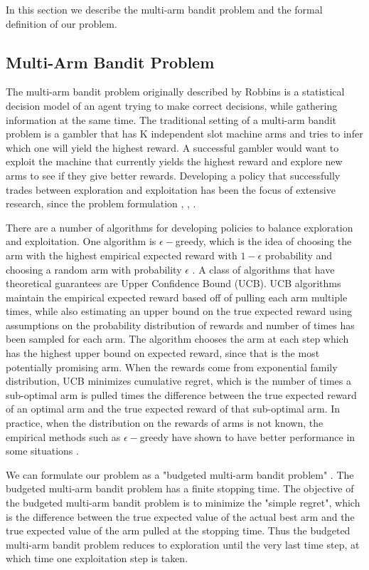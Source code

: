 \documentclass[letterpaper, 10 pt, conference]{ieeeconf}  %
\begin{document}
In this section we describe the multi-arm bandit problem and the formal definition of our problem.

\subsection{Multi-Arm Bandit Problem}
The multi-arm bandit problem originally described by Robbins \cite{robbins1985some} is a statistical decision model of an agent trying to make correct decisions, while gathering information at the same time.
The traditional setting of a multi-arm bandit problem is a gambler that has K independent slot machine arms and tries to infer which one will yield the highest reward.
A successful gambler would want to exploit the machine that currently yields the highest reward and explore new arms to see if they give better rewards.
Developing a policy that successfully trades between exploration and exploitation has been the focus of extensive research, since the problem formulation \cite{bubeck2009pure}, \cite{robbins1985some}, \cite{bergemann2006bandit}. 

There are a number of algorithms for developing policies to balance exploration and exploitation.
One algorithm is $\epsilon-$greedy, which is the idea of choosing the arm with the highest empirical expected reward with $1-\epsilon$ probability and choosing a random arm with probability $\epsilon$ \cite{barto1998reinforcement}.
A class of algorithms that have theoretical guarantees are Upper Confidence Bound (UCB).
UCB algorithms maintain the empirical expected reward based off of pulling each arm multiple times, while also estimating an upper bound on the true expected reward using assumptions on the probability distribution of rewards and number of times has been sampled for each arm.
The algorithm chooses the arm at each step which has the highest upper bound on expected reward, since that is the most potentially promising arm.
When the rewards come from exponential family distribution, UCB minimizes cumulative regret, which is the number of times a sub-optimal arm is pulled times the difference between the true expected reward of an optimal arm and the true expected reward of that sub-optimal arm.
In practice, when the distribution on the rewards of arms is not known, the empirical methods such as $\epsilon-$greedy have shown to have better performance in some situations \cite{kuleshov}.

We can formulate our problem as a "budgeted multi-arm bandit problem" \cite{madani2004budgeted}.
The budgeted multi-arm bandit problem has a finite stopping time.
The objective of the budgeted multi-arm bandit problem is to minimize the "simple regret", which is the difference between the true expected value of the actual best arm and the true expected value of the arm pulled at the stopping time.
Thus the budgeted multi-arm bandit problem reduces to exploration until the very last time step, at which time one exploitation step is taken.
\end{document}

